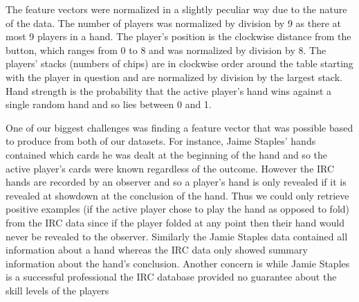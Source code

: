 \documentclass[twoside]{article}
\begin{document}
\begin{multicols}{2}
The feature vectors were normalized in a slightly peculiar way due to the nature of the data. The number of players was normalized by division by 9 as there at most 9 players in a hand. The player's position is the clockwise distance from the button, which ranges from 0 to 8 and was normalized by division by 8. The players' stacks (numbers of chips) are in clockwise order around the table starting with the player in question and are normalized by division by the largest stack. Hand strength is the probability that the active player's hand wins against a single random hand and so lies between 0 and 1.

One of our biggest challenges was finding a feature vector that was possible based to produce from both of our datasets. For instance, Jaime Staples' hands contained which cards he was dealt at the beginning of the hand and so the active player's cards were known regardless of the outcome. However the IRC hands are recorded by an observer and so a player's hand is only revealed if it is revealed at showdown at the conclusion of the hand. Thus we could only retrieve positive examples (if the active player chose to play the hand as opposed to fold) from the IRC data since if the player folded at any point then their hand would never be revealed to the observer. Similarly the Jamie Staples data contained all information about a hand whereas the IRC data only showed summary information about the hand's conclusion. Another concern is while Jamie Staples is a successful professional \cite{JaimeStaples} the IRC database provided no guarantee about the skill levels of the players


\end{multicols}
\end{document}
